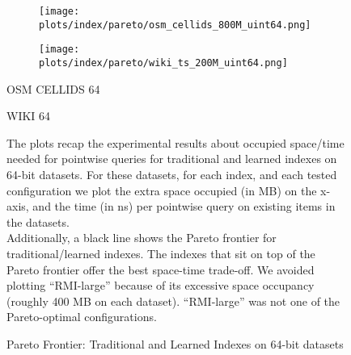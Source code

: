 \documentclass{article}
\begin{document}
\begin{figure}[!htbp]
{\begin{minipage}[t][0.98\textheight][t]{\textwidth}
    \begin{minipage}{0.48\linewidth}
        \begin{figure}[H]
        \texttt{[image: plots/index/pareto/osm\_cellids\_800M\_uint64.png]}
        \end{figure}
    \end{minipage}
    \begin{minipage}{0.48\linewidth}
        \begin{figure}[H]
        \texttt{[image: plots/index/pareto/wiki\_ts\_200M\_uint64.png]}
        \end{figure}
    \end{minipage}
    \begin{minipage}{0.48\linewidth}
    \begin{center}
        OSM CELLIDS 64
    \end{center}
    \end{minipage}
    \begin{minipage}{0.48\linewidth}
    \begin{center}
        WIKI 64
    \end{center}
    \end{minipage}

    \vspace{20px}
    
    \begin{minipage}{\linewidth}
    The plots recap the experimental results about occupied space/time needed for pointwise queries for traditional and learned indexes on 64-bit datasets. For these datasets, for each index, and each tested configuration we plot the extra space occupied (in MB) on the x-axis, and the time (in ns) per pointwise query on existing items in the datasets. \\

    Additionally, a black line shows the Pareto frontier for traditional/learned indexes. The indexes that sit on top of the Pareto frontier offer the best space-time trade-off.  
    We avoided plotting ``RMI-large'' because of its excessive space occupancy (roughly 400 MB on each dataset). ``RMI-large'' was not one of the Pareto-optimal configurations.
    \end{minipage}
    \vspace{10px}
\end{minipage}
}
\caption{Pareto Frontier: Traditional and Learned Indexes on 64-bit datasets}
\end{figure}
\end{document}

